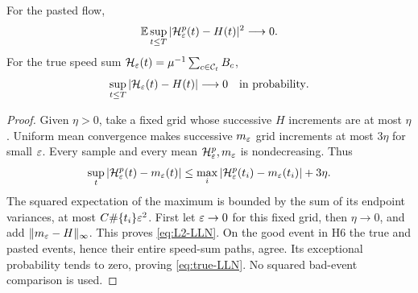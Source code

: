 \begin{proposition}\label{prop:LLN}
For the pasted flow,
\begin{equation}\label{eq:L2-LLN}
 \mathbb E\sup_{t\le T}|\mathcal H_\varepsilon^p(t)-H(t)|^2\longrightarrow0.
\end{equation}
For the true speed sum $\mathcal H_\varepsilon(t)=\mu^{-1}\sum_{c\in\mathcal C_t}B_c$,
\begin{equation}\label{eq:true-LLN}
 \sup_{t\le T}|\mathcal H_\varepsilon(t)-H(t)|\longrightarrow0
                                      \quad\text{in probability}.
\end{equation}
\end{proposition}
\begin{proof}
Given $\eta>0$, take a fixed grid whose successive $H$ increments are at
most $\eta$. Uniform mean convergence makes successive $m_\varepsilon$ grid
increments at most $3\eta$ for small $\varepsilon$. Every sample and every mean
$\mathcal H_\varepsilon^p,m_\varepsilon$ is nondecreasing. Thus
\[
 \sup_t|\mathcal H_\varepsilon^p(t)-m_\varepsilon(t)|
 \le\max_i|\mathcal H_\varepsilon^p(t_i)-m_\varepsilon(t_i)|+3\eta.
\]
The squared expectation of the maximum is bounded by the sum of its endpoint
variances, at most $C\#\{t_i\}\varepsilon^2$. First let $\varepsilon\to0$ for this
fixed grid, then $\eta\to0$, and add $\|m_\varepsilon-H\|_\infty$.
This proves \eqref{eq:L2-LLN}. On the good event in H6 the true and pasted
events, hence their entire speed-sum paths, agree. Its exceptional probability
tends to zero, proving \eqref{eq:true-LLN}. No squared bad-event comparison
is used.
\end{proof}
